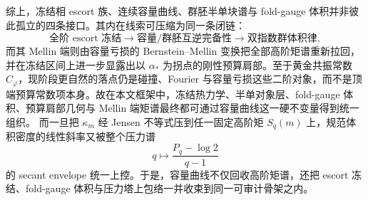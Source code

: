 

\noindent
综上，冻结相 escort 族、连续容量曲线、群胚半单块谱与 fold-gauge 体积并非彼此孤立的四条接口。其内在线索可压缩为同一条闭链：
\[
\text{全阶 escort 冻结}
\longrightarrow
\text{容量/群胚互逆完备性}
\longrightarrow
\text{双指数群体积律},
\]
而其 Mellin 端则由容量亏损的 Bernstein--Mellin 变换把全部高阶矩谱重新拉回，并在冻结区间上进一步显露出以 \(\alpha_\ast\) 为拐点的刚性预算肩部。至于黄金共振常数 \(C_\varphi\)，现阶段更自然的落点仍是碰撞、Fourier 与容量亏损这些二阶对象，而不是顶端预算常数项本身。故在本文框架中，冻结热力学、半单对象层、fold-gauge 体积、预算肩部几何与 Mellin 端矩谱最终都可通过容量曲线这一硬不变量得到统一组织。
而一旦把 \(\kappa_m\) 经 Jensen 不等式压到任一固定高阶矩 \(S_q(m)\) 上，规范体积密度的线性斜率又被整个压力谱
\[
q\longmapsto \frac{P_q-\log 2}{q-1}
\]
的 secant envelope 统一上控。于是，容量曲线不仅回收高阶矩谱，还把 escort 冻结、fold-gauge 体积与压力塔上包络一并收束到同一可审计骨架之内。

\endinput
